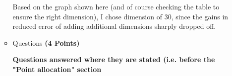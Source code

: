 \documentclass[a4paper]{article}
\theoremstyle{definition}
\begin{document}
\begin{itemize}
\begin{itemize}
Based on the graph shown here (and of course checking the table to ensure the right dimension), I chose dimension of 30, since the gains in reduced error of adding additional dimensions sharply dropped off.

\item Questions \textbf{(4 Points)}

\textbf{Questions answered where they are stated (i.e. before the "Point allocation" section}

\end{itemize}

\end{itemize}





\end{document}
